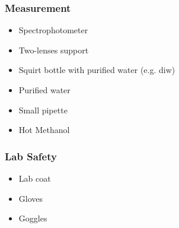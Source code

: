 \begin{appendices}
\subsubsection*{Measurement}
\begin{itemize}[itemsep=2pt,parsep=2pt]
  \item Spectrophotometer
  \item Two-lenses support
  \item Squirt bottle with purified water (e.g. \gls{diw})
  \item Purified water
  \item Small pipette 
  \item Hot Methanol
\end{itemize}
\subsubsection*{Lab Safety}
\begin{itemize}[itemsep=2pt,parsep=2pt]
  \item Lab coat
  \item Gloves
  \item Goggles
\end{itemize}

\end{appendices}
